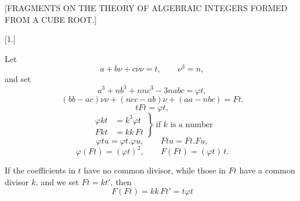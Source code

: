 \clearpage
{}
\begin{center}\large [FRAGMENTS ON THE THEORY OF ALGEBRAIC INTEGERS FORMED FROM A CUBE ROOT.]\end{center}

\begin{center}[1.]\end{center}\par\noindent\hspace*{\parindent}Let
\[
a+b\nu+c\nu\nu = t, \qquad \nu^3 = n,
\]
\noindent and set
\[
a^3+nb^3+nnc^3-3nabc = \varphi t,
\]
\[
(bb-ac)\nu\nu+(ncc-ab)\nu+(aa-nbc) = Ft.
\]
\noindent{}
\[
tFt = \varphi t,
\]
\[
\left.\begin{aligned}
\varphi kt &= k^3 \varphi t \\
Fkt &= kk\,Ft
\end{aligned}\right\}\ \text{if } k \text{ is a number}
\]
\[
\varphi tu = \varphi t . \varphi u, \qquad Ftu = Ft . Fu,
\]
\[
\varphi(Ft) = (\varphi t)^2, \qquad F(Ft) = (\varphi t)\,t.
\]

If the coefficients in $t$ have no common divisor, while those in $Ft$ have a
common divisor $k$, and we set $Ft = kt'$, then
\[
F(Ft) = kk\,Ft' = t\varphi t
\]%
